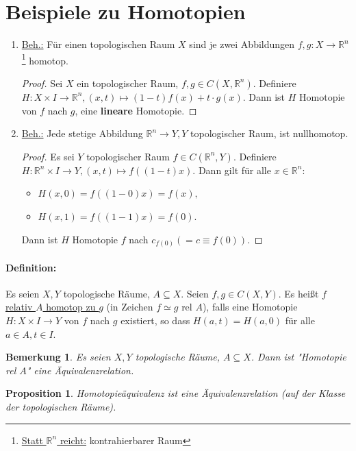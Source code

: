 \documentclass[a4paper,11pt,notitlepage]{report}
\newtheorem{proposition}{Proposition}[chapter]
\newtheorem{remark}{Bemerkung}[chapter]
\newcommand{\R}{{\ensuremath{\mathbb{R}}}}
\begin{document}
\section{Beispiele zu Homotopien}
\begin{enumerate}
	\item \underline{Beh.:} Für einen topologischen Raum $X$ sind je zwei Abbildungen $f,g \colon X \rightarrow \R^n$ \footnote{\underline{Statt $\R^n$ reicht:} kontrahierbarer Raum} homotop.
	\begin{proof}
		Sei $X$ ein topologischer Raum, $f,g \in C(X,\R^n)$.
		Definiere $H \colon X \times I \rightarrow \R^n, (x,t) \mapsto (1-t)f(x) + t \cdot g(x)$.
		Dann ist $H$ Homotopie von $f$ nach $g$, eine \textbf{lineare} Homotopie.
	\end{proof}
	
	\item \underline{Beh.:} Jede stetige Abbildung $\R^n \rightarrow Y, Y$ topologischer Raum, ist nullhomotop.
	\begin{proof}
		Es sei $Y$ topologischer Raum $f \in C(\R^n,Y)$.
		Definiere $H \colon \R^n \times I \rightarrow Y, (x,t) \mapsto f((1-t)x).$
		Dann gilt für alle $x \in \R^n:$
		\begin{itemize}
			\item $H(x,0)=f((1-0)x) = f(x),$
			\item $H(x,1)=f((1-1)x) = f(0).$
		\end{itemize}
		Dann ist $H$ Homotopie $f$ nach $c_{f(0)} (=c \equiv f(0)).$
	\end{proof}
\end{enumerate}

\paragraph{Definition:} Es seien $X,Y$ topologische Räume, $A \subseteq X$. Seien $f,g \in C(X,Y).$
Es heißt \underline{$f$ relativ $A$ homotop zu $g$} (in Zeichen $f \simeq g \text{ rel } A$), falls eine Homotopie $H \colon X \times I \rightarrow Y$ von $f$ nach $g$ existiert, so dass $H(a,t)=H(a,0)$ für alle $a \in A, t \in I$.

\begin{remark}{} Es seien $X,Y$ topologische Räume, $A \subseteq X$. Dann ist "Homotopie rel $A$" eine Äquivalenzrelation.
\end{remark}

\begin{proposition} Homotopieäquivalenz ist eine Äquivalenzrelation (auf der Klasse der topologischen Räume).
\end{proposition}
\end{document}
